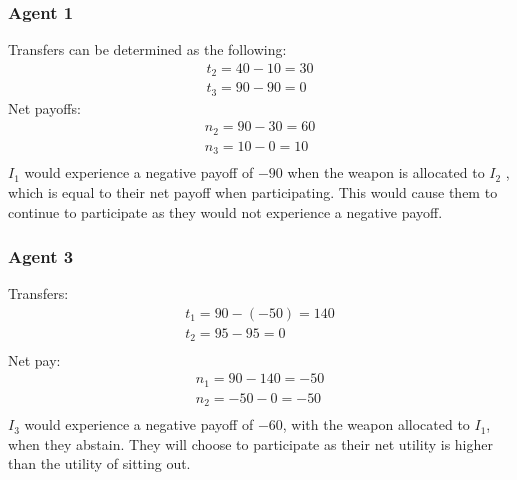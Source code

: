 \documentclass[10pt,a4paper]{article}
\begin{document}
    \subsubsection*{Agent 1}
    Transfers can be determined as the following:
    \begin{gather*}
      t_2 = 40-10 = 30 \\
      t_3 = 90-90 = 0
    \end{gather*}
    Net payoffs:
    \begin{gather*}
      n_2 = 90-30 = 60 \\
      n_3 = 10 - 0 = 10 \\
    \end{gather*}
    $I_1$ would experience a negative payoff of $-90$ when the weapon is allocated to $I_2$ , which is equal to their net payoff when participating. This would cause them to continue to participate as they would not experience a negative payoff. 
    \subsubsection*{Agent 3}
      Transfers:
      \begin{gather*}
        t_1 = 90-(-50) = 140 \\
        t_2 = 95-95 = 0 \\
      \end{gather*}
      Net pay:
      \begin{gather*}
        n_1 = 90 - 140 = -50 \\
        n_2 = -50 - 0 = -50 \\
      \end{gather*}
      $I_3$ would experience a negative payoff of $-60$, with the weapon allocated to $I_1$, when they abstain. They will choose to participate as their net utility is higher than the utility of sitting out. 
\end{document}
